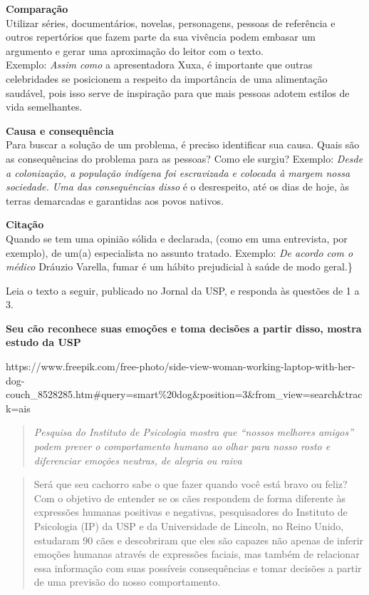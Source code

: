 \textbf{Comparação}\\
Utilizar séries, documentários, novelas, personagens, pessoas de
referência e outros repertórios que fazem parte da sua vivência podem
embasar um argumento e gerar uma aproximação do leitor com o texto.\\
Exemplo: \emph{Assim como} a apresentadora Xuxa, é importante que outras
celebridades se posicionem a respeito da importância de uma alimentação
saudável, pois isso serve de inspiração para que mais pessoas adotem
estilos de vida semelhantes.

\textbf{Causa e consequência}\\
Para buscar a solução de um problema, é preciso identificar sua causa.
Quais são as consequências do problema para as pessoas? Como ele surgiu?
Exemplo: \emph{Desde a colonização, a população indígena foi escravizada
e colocada à margem nossa sociedade. Uma das consequências disso} é o
desrespeito, até os dias de hoje, às terras demarcadas e garantidas aos
povos nativos.

\textbf{Citação}\\
Quando se tem uma opinião sólida e declarada, (como em uma entrevista,
por exemplo), de um(a) especialista no assunto tratado. Exemplo:
\emph{De acordo com o médico} Dráuzio Varella, fumar é um hábito
prejudicial à saúde de modo geral.\}

Leia o texto a seguir, publicado no Jornal da USP, e responda às
questões de 1 a 3.

\textbf{Seu cão reconhece suas emoções e toma decisões a partir disso,
mostra estudo da USP}

https://www.freepik.com/free-photo/side-view-woman-working-laptop-with-her-dog-couch\_8528285.htm\#query=smart\%20dog\&position=3\&from\_view=search\&track=ais

\begin{quote}
\emph{Pesquisa do Instituto de Psicologia mostra que ``nossos melhores
amigos'' podem prever o comportamento humano ao olhar para nosso rosto e
diferenciar emoções neutras, de alegria ou raiva}
\end{quote}

\begin{quote}
Será que seu cachorro sabe o que fazer quando você está bravo ou feliz?
Com o objetivo de entender se os cães respondem de forma diferente às
expressões humanas positivas e negativas, pesquisadores do Instituto de
Psicologia (IP) da USP e da Universidade de Lincoln, no Reino Unido,
estudaram 90 cães e descobriram que eles são capazes não apenas de
inferir emoções humanas através de expressões faciais, mas também de
relacionar essa informação com suas possíveis consequências e tomar
decisões a partir de uma previsão do nosso comportamento.
\end{quote}

